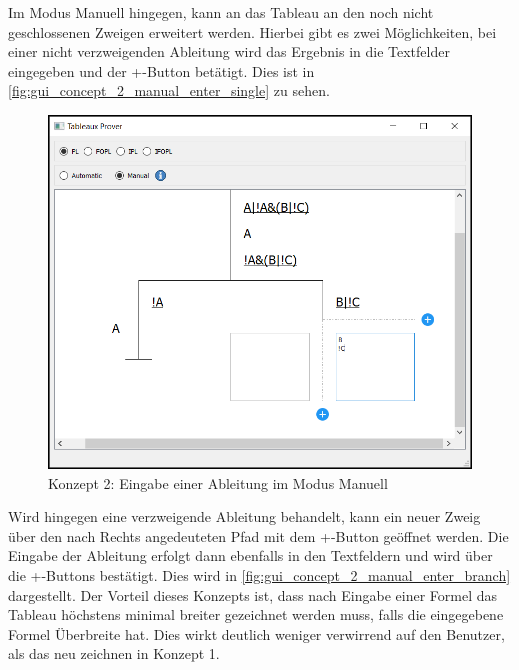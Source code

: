 Im Modus Manuell hingegen, kann an das Tableau an den noch nicht geschlossenen Zweigen erweitert werden. Hierbei gibt es zwei Möglichkeiten, bei einer nicht verzweigenden Ableitung wird das Ergebnis in die Textfelder eingegeben und der +-Button betätigt. Dies ist in \autoref{fig:gui_concept_2_manual_enter_single} zu sehen.
\begin{figure}[H]
\begin{center}
\includegraphics[scale=0.7]{images/gui_concept_2_manual_enter_single.png}
\caption{Konzept 2: Eingabe einer Ableitung im Modus Manuell}
\label{fig:gui_concept_2_manual_enter_single}
\end{center}
\end{figure}

Wird hingegen eine verzweigende Ableitung behandelt, kann ein neuer Zweig über den nach Rechts angedeuteten Pfad mit dem +-Button geöffnet werden. Die Eingabe der Ableitung erfolgt dann ebenfalls in den Textfeldern und wird über die +-Buttons bestätigt. Dies wird in \autoref{fig:gui_concept_2_manual_enter_branch} dargestellt. Der Vorteil dieses Konzepts ist, dass nach Eingabe einer Formel das Tableau höchstens minimal breiter gezeichnet werden muss, falls die eingegebene Formel Überbreite hat. Dies wirkt deutlich weniger verwirrend auf den Benutzer, als das neu zeichnen in Konzept 1.

